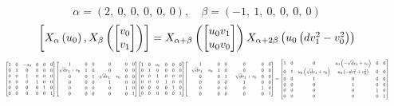 \documentclass[11pt]{article}
\theoremstyle{definition}
\begin{document}
\[
\alpha = \left( 2, \  0, \  0, \  0, \  0, \  0\right), \quad \beta = \left( -1, \  1, \  0, \  0, \  0, \  0\right)
\]
\[
\scaletoalign{\textwidth}{\left[ X_{\alpha}\left(u_{0}\right), X_{\beta}\left(\left[\begin{matrix}v_{0}\\v_{1}\end{matrix}\right]\right) \right] = X_{\alpha + \beta}\left(\left[\begin{matrix}u_{0} v_{1}\\u_{0} v_{0}\end{matrix}\right]\right) X_{\alpha + 2\beta}\left(u_{0} \left(d v_{1}^{2} - v_{0}^{2}\right)\right)}
\]
\[
\scaletoalign{\textwidth}{{\left[\begin{matrix}1 & 0 & - u_{0} & 0 & 0 & 0\\0 & 1 & 0 & 0 & 0 & 0\\0 & 0 & 1 & 0 & 0 & 0\\0 & 0 & 0 & 1 & 0 & 0\\0 & 0 & 0 & 0 & 1 & 0\\0 & 0 & 0 & 0 & 0 & 1\end{matrix}\right]} {\left[\begin{matrix}1 & 0 & 0 & 0 & 0 & 0\\\sqrt{d} v_{1} + v_{0} & 1 & 0 & 0 & 0 & 0\\0 & 0 & 1 & \sqrt{d} v_{1} - v_{0} & 0 & 0\\0 & 0 & 0 & 1 & 0 & 0\\0 & 0 & 0 & 0 & 1 & 0\\0 & 0 & 0 & 0 & 0 & 1\end{matrix}\right]} {\left[\begin{matrix}1 & 0 & u_{0} & 0 & 0 & 0\\0 & 1 & 0 & 0 & 0 & 0\\0 & 0 & 1 & 0 & 0 & 0\\0 & 0 & 0 & 1 & 0 & 0\\0 & 0 & 0 & 0 & 1 & 0\\0 & 0 & 0 & 0 & 0 & 1\end{matrix}\right]} {\left[\begin{matrix}1 & 0 & 0 & 0 & 0 & 0\\- \sqrt{d} v_{1} - v_{0} & 1 & 0 & 0 & 0 & 0\\0 & 0 & 1 & - \sqrt{d} v_{1} + v_{0} & 0 & 0\\0 & 0 & 0 & 1 & 0 & 0\\0 & 0 & 0 & 0 & 1 & 0\\0 & 0 & 0 & 0 & 0 & 1\end{matrix}\right]} = {\left[\begin{matrix}1 & 0 & 0 & u_{0} \left(- \sqrt{d} v_{1} + v_{0}\right) & 0 & 0\\0 & 1 & u_{0} \left(\sqrt{d} v_{1} + v_{0}\right) & u_{0} \left(- d v_{1}^{2} + v_{0}^{2}\right) & 0 & 0\\0 & 0 & 1 & 0 & 0 & 0\\0 & 0 & 0 & 1 & 0 & 0\\0 & 0 & 0 & 0 & 1 & 0\\0 & 0 & 0 & 0 & 0 & 1\end{matrix}\right]}}
\]
\end{document}
